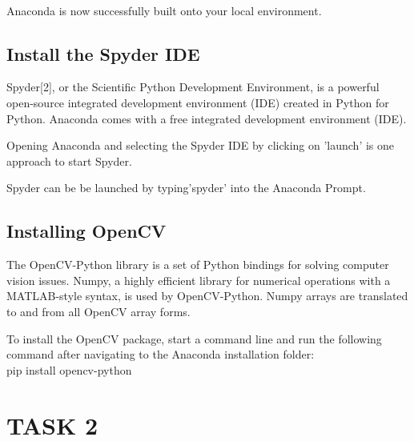 \documentclass[conference]{IEEEtran}
\begin{document}
\begin{enumerate}
\begin{figure}[!htbp]
    \label{fig:my_label}
\end{figure}
\begin{figure}[!htbp]
    \centering
    
\end{figure}
 \\Anaconda is now successfully built onto your local environment.

\end{enumerate}

\subsection {Install the Spyder IDE}

Spyder[2], or the Scientific Python Development Environment, is a powerful open-source integrated development environment (IDE) created in Python for Python. Anaconda comes with a free integrated development environment (IDE).

Opening Anaconda and selecting the Spyder IDE by clicking on 'launch' is one approach to start Spyder.

Spyder can be be launched by typing'spyder' into the Anaconda Prompt.
\subsection {Installing OpenCV}

The OpenCV-Python library is a set of Python bindings for solving computer vision issues. Numpy, a highly efficient library for numerical operations with a MATLAB-style syntax, is used by OpenCV-Python. Numpy arrays are translated to and from all OpenCV array forms.

To install the OpenCV package, start a command line and run the following command after navigating to the Anaconda installation folder: \\

pip install opencv-python \\


\section{TASK 2}
\end{document}
